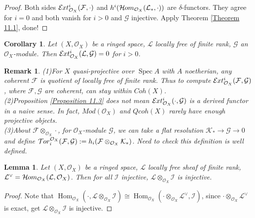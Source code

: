 \documentclass{ctexart}
\newtheorem{remark}{Remark}[section]
\newtheorem{lemma}{Lemma}[section]
\newtheorem{corollary}{Corollary}[section]
\renewcommand{\hom}{\operatorname{Hom}}
\newcommand{\sheafhom}{\mathcal{H}\kern -.5pt om}
\newcommand{\sheaftor}{\mathcal{T}\kern -.5pt or}
\newcommand{\sheafext}{\mathcal{E}\kern -.5pt xt}
\newcommand{\spec}{\operatorname{Spec}}
\begin{document}
\begin{proof}
    Both sides $\sheafext_{\mathcal{O}_{X}}^{i}(\mathcal{F}, \cdot)$ and $h^{i}(\sheafhom_{\mathcal{O}_{X}}(\mathcal{L}_{\ast}, \cdot))$ are $\delta$-functors.
    They agree for $i = 0$ and both vanish for $i > 0$ and $\mathcal{G}$ injective.
    Apply Theorem \ref{Theorem 11.1}, done!
\end{proof}
\begin{corollary}
    Let $(X, \mathcal{O}_{X})$ be a ringed space, $\mathcal{L}$ locally free of finite rank, $\mathcal{G}$ an $\mathcal{O}_{X}$-module.
    Then $\sheafext_{\mathcal{O}_{X}}^{i}(\mathcal{L}, \mathcal{G}) = 0$ for $i > 0$.
    \label{Corollary 11.1}
\end{corollary}
\begin{remark}
    (1)For $X$ quasi-projective over $\spec A$ with $A$ noetherian, any coherent $\mathcal{F}$ is quotient of locally free of finite rank.
    Thus to compute $\sheafext_{\mathcal{O}_{X}}^{i}(\mathcal{F}, \mathcal{G})$, where $\mathcal{F}, \mathcal{G}$ are coherent, can stay within $Coh(X)$. \\
    (2)Proposition \ref{Proposition 11.3} does not mean $\sheafext_{\mathcal{O}_{X}}^{i}(\cdot, \mathcal{G})$ is a derived functor in a naive sense.
    In fact, $Mod(\mathcal{O}_{X})$ and $Qcoh(X)$ rarely have enough projective objects. \\
    (3)About $\mathcal{F} \otimes_{\mathcal{O}_{X}} \cdot$, for $\mathcal{O}_{X}$-module $\mathcal{G}$, we can take a flat resolution $\mathcal{K}_{\ast} \longrightarrow \mathcal{G} \longrightarrow 0$ and define $\sheaftor_{i}^{\mathcal{O}_{X}}(\mathcal{F}, \mathcal{G}) := h_{i}(\mathcal{F} \otimes_{\mathcal{O}_{X}} \mathcal{K}_{\ast})$.
    Need to check this definition is well defined.
\end{remark}
\begin{lemma}
    Let $(X, \mathcal{O}_{X})$ be a ringed space, $\mathcal{L}$ locally free sheaf of finite rank, $\mathcal{L}^{\lor} = \sheafhom_{\mathcal{O}_{X}}(\mathcal{L}, \mathcal{O}_{X})$.
    Then for all $\mathcal{I}$ injective, $\mathcal{L} \otimes_{\mathcal{O}_{X}} \mathcal{I}$ is injective.
    \label{Lemma 11.2}
\end{lemma}
\begin{proof}
    Note that $\hom_{\mathcal{O}_{X}}(\cdot, \mathcal{L} \otimes_{\mathcal{O}_{X}} \mathcal{I}) \cong \hom_{\mathcal{O}_{X}}(\cdot \otimes_{\mathcal{O}_{X}} \mathcal{L}^{\lor}, \mathcal{I})$,
    since $\cdot \otimes_{\mathcal{O}_{X}} \mathcal{L}^{\lor}$ is exact, get $\mathcal{L} \otimes_{\mathcal{O}_{X}} \mathcal{I}$ is injective.
\end{proof}
\end{document}
